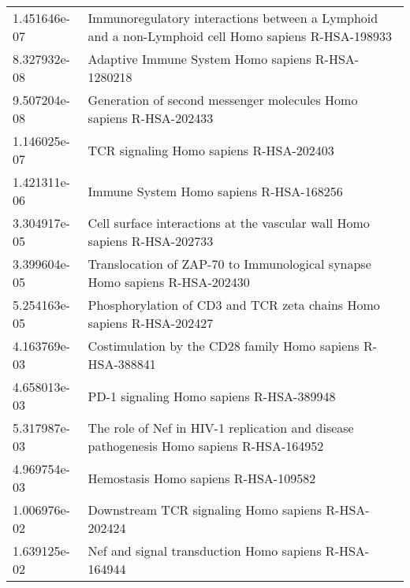 \begin{longtable}{p{2.4cm}p{14.5cm}}
\bottomrule
\endlastfoot
             1.451646e-07 &  Immunoregulatory interactions between a Lymphoid and a non-Lymphoid cell Homo sapiens R-HSA-198933 \\
             8.327932e-08 &                                                   Adaptive Immune System Homo sapiens R-HSA-1280218 \\
             9.507204e-08 &                                  Generation of second messenger molecules Homo sapiens R-HSA-202433 \\
             1.146025e-07 &                                                             TCR signaling Homo sapiens R-HSA-202403 \\
             1.421311e-06 &                                                             Immune System Homo sapiens R-HSA-168256 \\
             3.304917e-05 &                            Cell surface interactions at the vascular wall Homo sapiens R-HSA-202733 \\
             3.399604e-05 &                          Translocation of ZAP-70 to Immunological synapse Homo sapiens R-HSA-202430 \\
             5.254163e-05 &                                Phosphorylation of CD3 and TCR zeta chains Homo sapiens R-HSA-202427 \\
             4.163769e-03 &                                          Costimulation by the CD28 family Homo sapiens R-HSA-388841 \\
             4.658013e-03 &                                                            PD-1 signaling Homo sapiens R-HSA-389948 \\
             5.317987e-03 &             The role of Nef in HIV-1 replication and disease pathogenesis Homo sapiens R-HSA-164952 \\
             4.969754e-03 &                                                                Hemostasis Homo sapiens R-HSA-109582 \\
             1.006976e-02 &                                                  Downstream TCR signaling Homo sapiens R-HSA-202424 \\
             1.639125e-02 &                                               Nef and signal transduction Homo sapiens R-HSA-164944 \\
\end{longtable}


